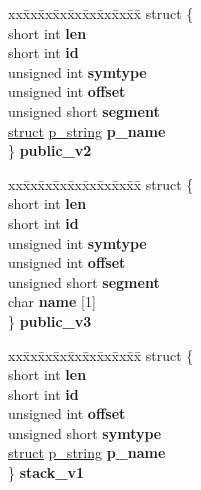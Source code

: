 \begin{DoxyCompactItemize}
\begin{tabbing}
\end{tabbing}\item 
\mbox{\label{unioncodeview__symbol_ac31632c2f08de7efffd347278cfca1bb}} 
\begin{tabbing}
xx\=xx\=xx\=xx\=xx\=xx\=xx\=xx\=xx\=\kill
struct \{\\
\>short int {\bfseries len}\\
\>short int {\bfseries id}\\
\>unsigned int {\bfseries symtype}\\
\>unsigned int {\bfseries offset}\\
\>unsigned short {\bfseries segment}\\
\>\hyperlink{interfacestruct}{struct} \hyperlink{structp__string}{p\_string} {\bfseries p\_name}\\
\} {\bfseries public\_v2}\\

\end{tabbing}\item 
\mbox{\label{unioncodeview__symbol_a71718cb4cfdb303879b97e84900e32a4}} 
\begin{tabbing}
xx\=xx\=xx\=xx\=xx\=xx\=xx\=xx\=xx\=\kill
struct \{\\
\>short int {\bfseries len}\\
\>short int {\bfseries id}\\
\>unsigned int {\bfseries symtype}\\
\>unsigned int {\bfseries offset}\\
\>unsigned short {\bfseries segment}\\
\>char {\bfseries name} \mbox{[}1\mbox{]}\\
\} {\bfseries public\_v3}\\

\end{tabbing}\item 
\mbox{\label{unioncodeview__symbol_a4f379b3fae176c070fcf790565b9297e}} 
\begin{tabbing}
xx\=xx\=xx\=xx\=xx\=xx\=xx\=xx\=xx\=\kill
struct \{\\
\>short int {\bfseries len}\\
\>short int {\bfseries id}\\
\>unsigned int {\bfseries offset}\\
\>unsigned short {\bfseries symtype}\\
\>\hyperlink{interfacestruct}{struct} \hyperlink{structp__string}{p\_string} {\bfseries p\_name}\\
\} {\bfseries stack\_v1}\\


\end{tabbing}
\end{DoxyCompactItemize}
